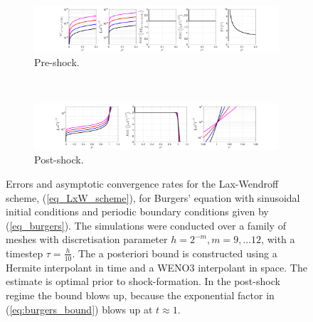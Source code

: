 \documentclass[final]{amsart}
\numberwithin{equation}{section}
\begin{document}
\begin{figure}[H]
	\begin{subfigure}[b]{\textwidth}
		\includegraphics[width=\textwidth]{../figures/fig_LxW_preshockplots_1x5_sin_IC_P3_burgers}	
		\caption{
			\label{sfig:LxF_burgers_preshock}
			Pre-shock.
		}
	\end{subfigure}
	\\
	\begin{subfigure}[b]{\textwidth}
		\includegraphics[width=\textwidth]{../figures/fig_LxW_postshockplots_1x5_sin_IC_P3_burgers}	
		\caption{\label{sfig:LxF_burgers_postshock}
		Post-shock.
		}
	\end{subfigure}
	\caption{\label{fig:LxW} Errors and asymptotic convergence
          rates for the Lax-Wendroff scheme, (\ref{eq_LxW_scheme}),
          for Burgers' equation with sinusoidal initial conditions and
          periodic boundary conditions given by
          (\ref{eq_burgers}). The simulations were conducted over a
          family of meshes with discretisation parameter $h = 2^{-m},
          m = 9,\dots 12$, with a timestep $\tau = \tfrac{h}{10}$. The a posteriori bound is constructed using a Hermite interpolant in time and a WENO3 interpolant in space.  The estimate is optimal prior to
          shock-formation.   In the
          post-shock regime the bound blows up, because the exponential factor in (\ref{eq:burgers_bound}) blows up at $t\approx1$.}
\end{figure}
\end{document}
